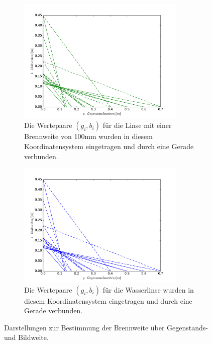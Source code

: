 \begin{figure}
  \centering
    \begin{subfigure}{0.48\textwidth}
      \includegraphics[height = 6cm]{plots/100mmLinsegbplot.pdf}
      \caption{Die Wertepaare \texorpdfstring{$\left(g_i , b_i \right)$}{math}
       für die Linse mit einer Brennweite von 100mm wurden in diesem
       Koordinatensystem eingetragen und durch eine Gerade verbunden. }
      \label{fig:Lgb}
    \end{subfigure}
    \begin{subfigure}{0.48\textwidth}
      \includegraphics[height = 6cm]{plots/Wasserlinsegbplot.pdf}
      \caption{Die Wertepaare \texorpdfstring{$\left(g_i , b_i \right)$}{math}
       für die Wasserlinse wurden in diesem Koordinatensystem eingetragen und durch eine Gerade verbunden. }
      \label{fig:Wgb}
    \end{subfigure}
    \caption{Darstellungen zur Bestimmung der Brennweite über Gegenstands- und Bildweite.}
    \label{fig:gb}
\end{figure}
\FloatBarrier

